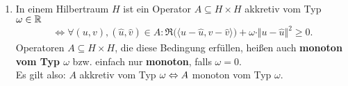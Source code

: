 \begin{beispiel}\
	\begin{enumerate}[label=(\alph*)]
		\item In einem Hilbertraum $H$ ist ein Operator $A\subseteq H\times H$ akkretiv vom Typ $\omega\in\mathbb{R}$
		\begin{align*}
			\Longleftrightarrow\forall(u,v),(\hat{u},\hat{v})\in A:
			\Re\big(\langle u-\hat{u},v-\hat{v}\rangle\big)+\omega\cdot\Vert u-\hat{u}\Vert^2\geq0.
		\end{align*}
		Operatoren $A\subseteq H\times H$, die diese Bedingung erfüllen, heißen auch \textbf{monoton vom Typ $\omega$} bzw. einfach nur \textbf{monoton}, falls $\omega=0$.\\
		Es gilt also: $A$ akkretiv vom Typ $\omega\Leftrightarrow A$ monoton vom Typ $\omega$.


\end{enumerate}
\end{beispiel}
